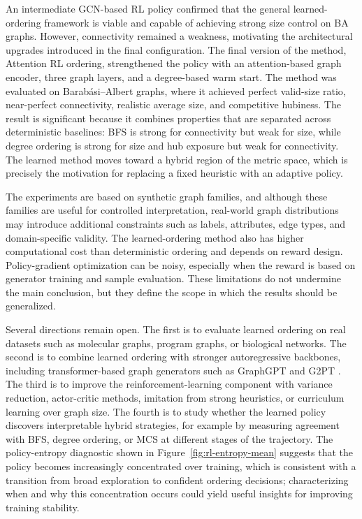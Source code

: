 An intermediate GCN-based RL policy confirmed that the general learned-ordering framework is viable and capable of achieving strong size control on BA graphs. However, connectivity remained a weakness, motivating the architectural upgrades introduced in the final configuration. The final version of the method, Attention RL ordering, strengthened the policy with an attention-based graph encoder, three graph layers, and a degree-based warm start. The method was evaluated on Barab\'asi--Albert graphs, where it achieved perfect valid-size ratio, near-perfect connectivity, realistic average size, and competitive hubiness. The result is significant because it combines properties that are separated across deterministic baselines: BFS is strong for connectivity but weak for size, while degree ordering is strong for size and hub exposure but weak for connectivity. The learned method moves toward a hybrid region of the metric space, which is precisely the motivation for replacing a fixed heuristic with an adaptive policy.

The experiments are based on synthetic graph families, and although these families are useful for controlled interpretation, real-world graph distributions may introduce additional constraints such as labels, attributes, edge types, and domain-specific validity. The learned-ordering method also has higher computational cost than deterministic ordering and depends on reward design. Policy-gradient optimization can be noisy, especially when the reward is based on generator training and sample evaluation. These limitations do not undermine the main conclusion, but they define the scope in which the results should be generalized.

Several directions remain open. The first is to evaluate learned ordering on real datasets such as molecular graphs, program graphs, or biological networks. The second is to combine learned ordering with stronger autoregressive backbones, including transformer-based graph generators such as GraphGPT \cite{zhao2023graphgpt} and G2PT \cite{chen2025g2pt}. The third is to improve the reinforcement-learning component with variance reduction, actor-critic methods, imitation from strong heuristics, or curriculum learning over graph size. The fourth is to study whether the learned policy discovers interpretable hybrid strategies, for example by measuring agreement with BFS, degree ordering, or MCS at different stages of the trajectory. The policy-entropy diagnostic shown in Figure~\ref{fig:rl-entropy-mean} suggests that the policy becomes increasingly concentrated over training, which is consistent with a transition from broad exploration to confident ordering decisions; characterizing when and why this concentration occurs could yield useful insights for improving training stability.

